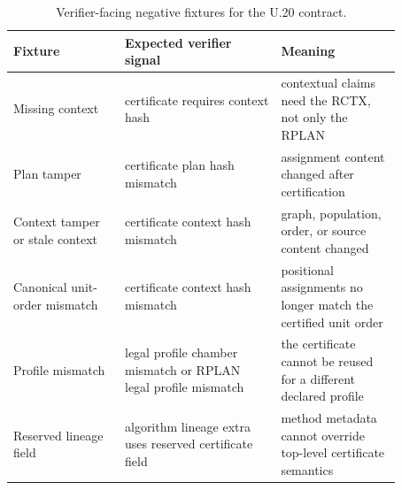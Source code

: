 \begin{table}[htbp]
\centering
\small
\begin{tabular}{p{0.25\linewidth}p{0.35\linewidth}p{0.27\linewidth}}
\toprule
Fixture & Expected verifier signal & Meaning \\
\midrule
Missing context & certificate requires context hash & contextual claims need
the RCTX, not only the RPLAN \\
Plan tamper & certificate plan hash mismatch & assignment content changed
after certification \\
Context tamper or stale context & certificate context hash mismatch & graph,
population, order, or source content changed \\
Canonical unit-order mismatch & certificate context hash mismatch & positional
assignments no longer match the certified unit order \\
Profile mismatch & legal profile chamber mismatch or RPLAN legal profile
mismatch & the certificate cannot be reused for a different declared profile \\
Reserved lineage field & algorithm lineage extra uses reserved certificate
field & method metadata cannot override top-level certificate semantics \\
\bottomrule
\end{tabular}
\caption{Verifier-facing negative fixtures for the U.20 contract.}
\end{table}
